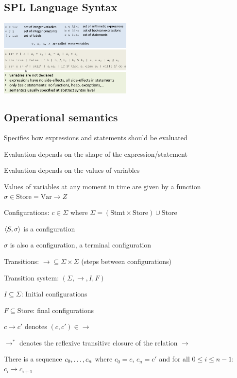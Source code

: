 \subsection{SPL Language Syntax}
\includegraphics[width=0.5\textwidth]{img/spl_language_syntax.png}

\subsection{Operational semantics}
\enumstart
	\item Specifies how expressions and statements should be evaluated
	\item Evaluation depends on the shape of the expression/statement
	\item Evaluation depends on the values of variables
	\item Values of variables at any moment in time are given by a function $\sigma \in \text{Store} = \text{Var} \rightarrow Z$
	\item Configurations: $c \in \Sigma$ where $\Sigma = (\text{Stmt} \times \text{Store}) \cup \text{Store}$
	\enumstart
		\item $\langle S, \sigma \rangle$ is a configuration
		\item $\sigma$ is also a configuration, a terminal configuration
	\enumend
	\item Transitions: $\rightarrow \subseteq \Sigma \times \Sigma$ (steps between configurations)
	\item Transition system: $(\Sigma, \rightarrow, I, F)$
	\enumstart
		\item $I \subseteq \Sigma$: Initial configurations
		\item $F \subseteq \text{Store}$: final configurations
	\enumend
	\item $c \rightarrow c'$ denotes $(c, c') \in \rightarrow$
	\item $\rightarrow^*$ denotes the reflexive transitive closure of the relation $\rightarrow$
	\enumstart
		\item There is a sequence $c_0, \mathellipsis, c_n$ where $c_0 = c$, $c_n = c'$ and for all $0 \le i \le n-1$: $c_i \rightarrow c_{i+1}$
	\enumend
\enumend

